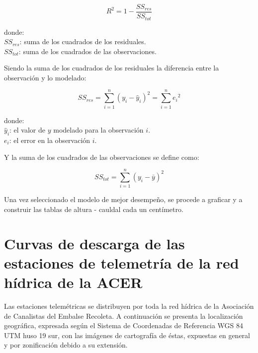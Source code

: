 \documentclass[]{article}
\begin{document}
\[{R^2} = 1 - \frac{{S{S_{res}}}}{{S{S_{tot}}}}\]

donde:\\
\(S{S_{res}}\): suma de los cuadrados de los residuales.\\
\(S{S_{tot}}\): suma de los cuadrados de las observaciones.

Siendo la suma de los cuadrados de los residuales la diferencia entre la
observación y lo modelado:

\[S{S_{res}} = \sum\limits_{i = 1}^n {{{\left( {{y_i} - {{\hat y}_i}} \right)}^2}} = \sum\limits_{i = 1}^n {{{e_i}^2}}\]

donde:\\
\(\hat y _i\): el valor de \(y\) modelado para la observación \(i\).\\
\(e_i\): el error en la observación \(i\).

Y la suma de los cuadrados de las observaciones se define como:

\[S{S_{tot}} = \sum\limits_{i = 1}^n {{{\left( {{y_i} - \bar y} \right)}^2}} \]

Una vez seleccionado el modelo de mejor desempeño, se procede a graficar
y a construir las tablas de altura - cauldal cada un centímetro.

\section{Curvas de descarga de las estaciones de telemetría de la red
hídrica de la
ACER}\label{curvas-de-descarga-de-las-estaciones-de-telemetria-de-la-red-hidrica-de-la-acer}

Las estaciones telemétricas se distribuyen por toda la red hídrica de la
Asociación de Canalistas del Embalse Recoleta. A continuación se
presenta la localización geográfica, expresada según el Sistema de
Coordenadas de Referencia WGS 84 UTM huso 19 sur, con las imágenes de
cartografía de éstas, expuestas en general y por zonificación debido a
su extensión.
\end{document}
